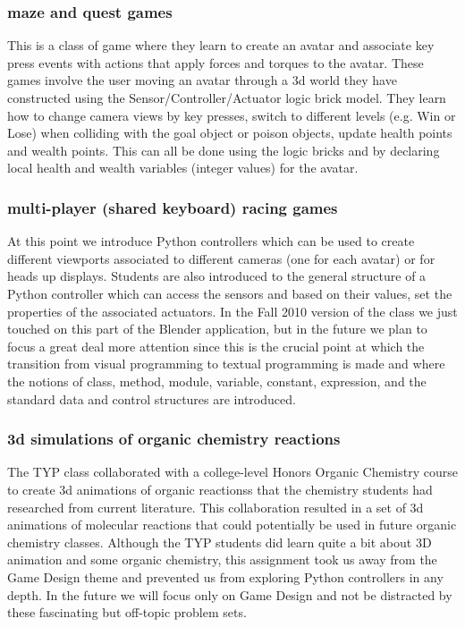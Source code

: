\documentclass{sig-alternate}
\begin{document}
\subsubsection{ maze and quest games}
This is a class of game where they learn to create an avatar and associate key press events with actions that apply forces and torques to the avatar. These games involve the user moving an avatar through a
3d world they have constructed using the Sensor/Controller/Actuator logic brick model. They learn how
to change camera views by key presses, switch to different levels (e.g. Win or Lose) when colliding with
the goal object or poison objects, update health points and wealth points. This can all be done using 
the logic bricks and by declaring local health and wealth variables (integer values) for the avatar.


\subsubsection{multi-player (shared keyboard) racing games}
At this point we introduce Python controllers which can be used to create different viewports associated
to different cameras (one for each avatar) or for heads up displays. Students are also introduced to the
general structure of a Python controller which can access the sensors and based on their values,
set the properties of the associated actuators. In the Fall 2010 version of the class we just touched on this part of the Blender application, but in the future we plan to focus a great deal more attention since this is the crucial point at which the transition from visual programming to textual programming is made and where the notions of class, method, module,  variable, constant, expression, and the standard data and control structures are introduced.
\subsubsection{3d simulations of organic chemistry reactions}
The TYP class collaborated with a college-level Honors Organic Chemistry course to create 3d animations of organic reactionss that the chemistry students had researched from current literature. This collaboration resulted in a set of 3d animations of molecular reactions that could potentially be used in future organic chemistry classes. Although the TYP students did learn quite a bit about 3D animation and some organic chemistry, this assignment took us away from the Game Design theme and prevented us from exploring Python controllers in any depth. In the future we will focus only on Game Design and not be distracted by these fascinating but off-topic problem sets.
\end{document}
